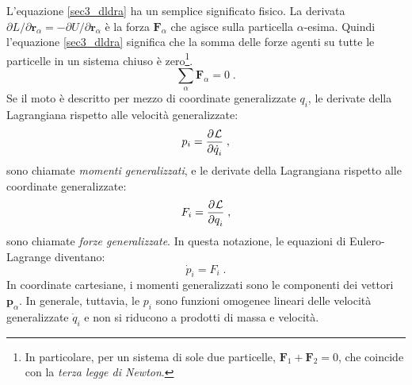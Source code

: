 L'equazione \eqref{sec3_dldra} ha un semplice significato fisico. La derivata $\partial L/\partial\mathbf{r}_{\alpha}=-
\partial U/\partial\mathbf{r}_{\alpha}$ è la forza $\mathbf{F}_{\alpha}$ che agisce sulla particella $\alpha$-esima. Quindi l'equazione \eqref{sec3_dldra} significa che la somma delle forze agenti su tutte le particelle in un sistema chiuso è zero\footnote{In particolare, per un sistema di sole due particelle, $\mathbf{F}_1+\mathbf{F}_2=0$, che coincide con la \textit{terza legge di Newton}.}.
\begin{equation}
\sum_{\alpha} \mathbf{F}_{\alpha}=0\;.
\end{equation}
Se il moto è descritto per mezzo di coordinate generalizzate $q_i$, le derivate della Lagrangiana rispetto alle velocità generalizzate:
\begin{equation}
p_i=\frac{\partial^{}\mathcal{L}}{\partial \dot{q}_i^{}}\;,
\end{equation}
sono chiamate \textit{momenti generalizzati}, e le derivate della Lagrangiana rispetto alle coordinate generalizzate:
\begin{equation}
F_i=\frac{\partial^{}\mathcal{L}}{\partial q_i^{}}\;,
\end{equation}
sono chiamate \textit{forze generalizzate}. In questa notazione, le equazioni di Eulero-Lagrange diventano:
\begin{equation}
\dot{p}_i=F_i\;.
\end{equation}
In coordinate cartesiane, i momenti generalizzati sono le componenti dei vettori $\mathbf{p}_{\alpha}$. In generale, tuttavia, le $p_i$ sono funzioni omogenee lineari delle velocità generalizzate $\dot{q}_i$ e non si riducono a prodotti di massa e velocità.
